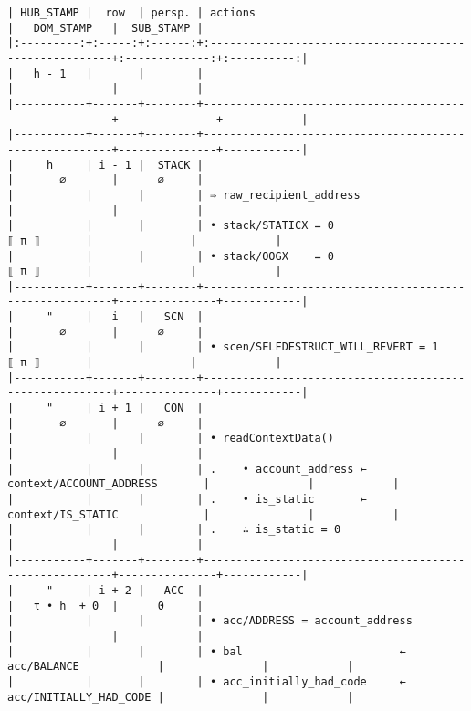 \documentclass[varwidth=\maxdimen,margin=0.5cm,multi={verbatim}]{standalone}
\begin{document}
\begin{verbatim}
| HUB_STAMP |  row  | persp. | actions                                                |   DOM_STAMP   |  SUB_STAMP |
|:---------:+:-----:+:------:+:-------------------------------------------------------+:-------------:+:----------:|
|   h - 1   |       |        |                                                        |               |            |
|-----------+-------+--------+--------------------------------------------------------+---------------+------------|
|-----------+-------+--------+--------------------------------------------------------+---------------+------------|
|     h     | i - 1 |  STACK |                                                        |       ∅       |      ∅     |
|           |       |        | ⇒ raw_recipient_address                                |               |            |
|           |       |        | • stack/STATICX = 0                        ⟦ π ⟧       |               |            |
|           |       |        | • stack/OOGX    = 0                        ⟦ π ⟧       |               |            |
|-----------+-------+--------+--------------------------------------------------------+---------------+------------|
|     "     |   i   |   SCN  |                                                        |       ∅       |      ∅     |
|           |       |        | • scen/SELFDESTRUCT_WILL_REVERT = 1        ⟦ π ⟧       |               |            |
|-----------+-------+--------+--------------------------------------------------------+---------------+------------|
|     "     | i + 1 |   CON  |                                                        |       ∅       |      ∅     |
|           |       |        | • readContextData()                                    |               |            |
|           |       |        | .    • account_address ← context/ACCOUNT_ADDRESS       |               |            |
|           |       |        | .    • is_static       ← context/IS_STATIC             |               |            |
|           |       |        | .    ∴ is_static = 0                                   |               |            |
|-----------+-------+--------+--------------------------------------------------------+---------------+------------|
|     "     | i + 2 |   ACC  |                                                        |   τ • h  + 0  |      0     |
|           |       |        | • acc/ADDRESS = account_address                        |               |            |
|           |       |        | • bal                        ←  acc/BALANCE            |               |            |
|           |       |        | • acc_initially_had_code     ←  acc/INITIALLY_HAD_CODE |               |            |

\end{verbatim}
\end{document}
